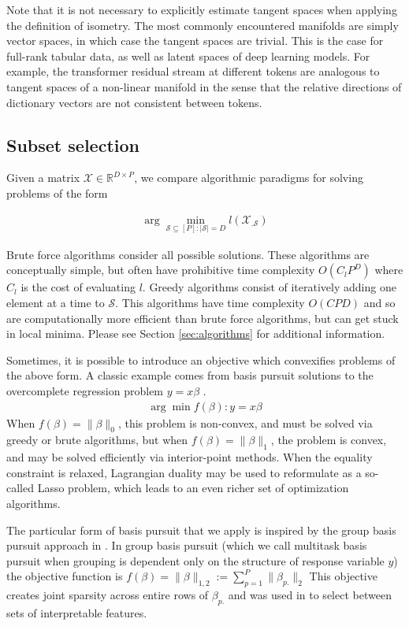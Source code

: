 Note that it is not necessary to explicitly estimate tangent spaces when applying the definition of isometry.
The most commonly encountered manifolds are simply vector spaces, in which case the tangent spaces are trivial.
This is the case for full-rank tabular data, as well as latent spaces of deep learning models.
For example, the transformer residual stream at different tokens are analogous to tangent spaces of a non-linear manifold in the sense that the relative directions of dictionary vectors are not consistent between tokens.

\subsection{Subset selection}

Given a matrix $\mathcal X \in \mathbb R^{D \times P}$, we compare algorithmic paradigms for solving problems of the form

\begin{align}
\label{prog:ground_truth}
\arg \min_{\mathcal S \subseteq [P] : |\mathcal S| = D} l (\mathcal X_{.\mathcal S})
\end{align}

Brute force algorithms consider all possible solutions.
These algorithms are conceptually simple, but often have prohibitive time complexity $O(C_lP^D)$ where $C_l$ is the cost of evaluating $l$.
Greedy algorithms consist of iteratively adding one element at a time to $\mathcal S$.
This algorithms have time complexity $O(CPD)$ and so are computationally more efficient than brute force algorithms, but can get stuck in local minima.
Please see Section \ref{sec:algorithms} for additional information.

Sometimes, it is possible to introduce an objective which convexifies problems of the above form.
A classic example comes from basis pursuit solutions to the overcomplete regression problem $y = x\beta$ \cite{Chen2001-hh}.
\begin{align}
\arg \min f (\beta) : y  = x\beta 
\end{align}
When $f(\beta) = \|\beta\|_0$, this problem is non-convex, and must be solved via greedy or brute algorithms, but when $f(\beta) =\|\beta\|_1$, the problem is convex, and may be solved efficiently via interior-point methods.
When the equality constraint is relaxed, Lagrangian duality may be used to reformulate as a so-called Lasso problem, which leads to an even richer set of optimization algorithms. %


The particular form of basis pursuit that we apply is inspired by the group basis pursuit approach in \citet{Koelle2022-ju}.
In group basis pursuit (which we call multitask basis pursuit when grouping is dependent only on the structure of response variable $y$) the objective function is $f(\beta) = \|\beta\|_{1,2} := \sum_{p=1}^P \|\beta_{p.}\|_2$  \citep{Yuan2006-bt, Obozinski2006-kq, Yeung2011-fg}
This objective creates joint sparsity across entire rows of $\beta_{p.}$ and was used in \citep{Koelle2022-ju} to select between sets of interpretable features.
